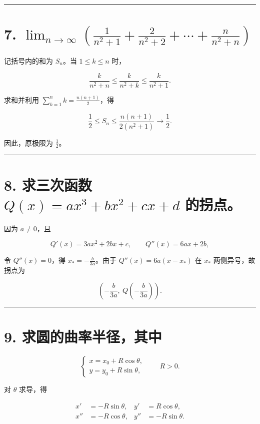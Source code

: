 \documentclass[11pt,a4paper,fontset=windows]{ctexart}
\begin{document}
\par{}\vspace{0.5em}\hrule\vspace{0.2em}
\section*{7. \(\displaystyle\lim_{n\to\infty}\left(\frac1{n^2+1}+\frac2{n^2+2}+\cdots+\frac n{n^2+n}\right)\)}

记括号内的和为 \(S_n\)。当 \(1\le k\le n\) 时，

\[
\frac{k}{n^2+n}\le\frac{k}{n^2+k}\le\frac{k}{n^2+1}.
\]

求和并利用 \(\displaystyle\sum_{k=1}^n k=\frac{n(n+1)}2\)，得

\[
\frac12\le S_n\le\frac{n(n+1)}{2(n^2+1)}\longrightarrow\frac12.
\]

因此，原极限为 \(\boxed{\frac12}\)。
\par{}\vspace{0.5em}\hrule\vspace{0.2em}
\section*{8. 求三次函数 \(Q(x)=ax^3+bx^2+cx+d\) 的拐点。}

因为 \(a\ne0\)，且

\[
Q'(x)=3ax^2+2bx+c,\qquad Q''(x)=6ax+2b,
\]

令 \(Q''(x)=0\)，得 \(\displaystyle x_*=-\frac{b}{3a}\)。由于
\(Q''(x)=6a(x-x_*)\) 在 \(x_*\) 两侧异号，故拐点为

\[
\boxed{\left(-\frac{b}{3a},\ Q\!\left(-\frac{b}{3a}\right)\right)}.
\]

\par{}\vspace{0.5em}\hrule\vspace{0.2em}
\section*{9. 求圆的曲率半径，其中}

\[
\begin{cases}
x=x_0+R\cos\theta,\\
y=y_0+R\sin\theta,
\end{cases}
\qquad R>0.
\]

对 \(\theta\) 求导，得

\[
\begin{aligned}
x'&=-R\sin\theta,& y'&=R\cos\theta,\\
x''&=-R\cos\theta,& y''&=-R\sin\theta.
\end{aligned}
\]
\end{document}

